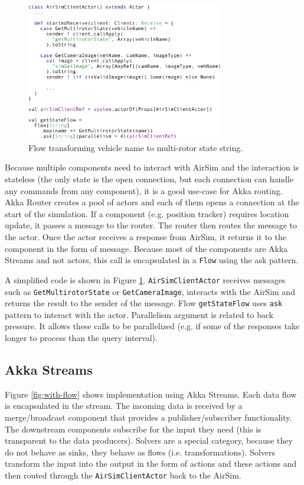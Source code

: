 \documentclass{article}
\begin{document}
\begin{figure}
	\centering
	\includegraphics[width=8.6cm]{air-sim-client}
	\caption{Flow transforming vehicle name to multi-rotor state string.}\label{fig:air-sim-client}
\end{figure}


Because multiple components need to interact with AirSim and the interaction is stateless (the only state is the open connection, but each connection can handle any commands from any component), it is a good use-case for Akka routing. Akka Router creates a pool of actors and each of them opens a connection at the start of the simulation. If a component (e.g. position tracker) requires location update, it passes a message to the router. The router then routes the message to the actor. Once the actor receives a response from AirSim, it returns it to the component in the form of message. Because most of the components are Akka Streams and not actors, this call is encapsulated in a \verb|Flow| using the ask pattern. 

A simplified code is shown in Figure \ref{fig:air-sim-client}. \verb|AirSimClientActor| receives messages such as \verb|GetMultirotorState| or \verb|GetCameraImage|, interacts with the AirSim and returns the result to the sender of the message. Flow \verb|getStateFlow| uses \verb|ask| pattern to interact with the actor. Parallelism argument is related to back pressure. It allows these calls to be parallelized (e.g. if some of the responses take longer to process than the query interval).

\subsection{Akka Streams}
Figure \ref{fig:with-flow} shows implementation using Akka Streams. Each data flow is encapsulated in the stream. The incoming data is received by a merge/broadcast component that provides a publisher/subscriber functionality. The downstream components subscribe for the input they need (this is transparent to the data producers). Solvers are a special category, because they do not behave as sinks, they behave as flows (i.e. transformations). Solvers transform the input into the output in the form of actions and these actions and then routed through the \verb|AirSimClientActor| back to the AirSim.
\end{document}
